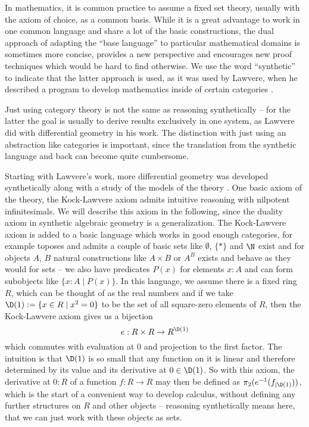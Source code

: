 
In mathematics, it is common practice to assume a fixed set theory, usually with the axiom of choice, as a common basis. While it is a great advantage to work in one common language and share a lot of the basic constructions, the dual approach of adapting the  ``base language'' to particular mathematical domains is sometimes more concise, provides a new perspective and encourages new proof techniques which would be hard to find otherwise.
We use the word ``synthetic'' to indicate that the latter approach is used,
as it was used by Lawvere, when he described a program to develop mathematics inside of certain categories \cite{lawvere-categorical-dynamics}.

Just using category theory is not the same as reasoning synthetically -- for the latter the goal is usually to derive results exclusively in one system,
as Lawvere did with differential geometry in his work.
The distinction with just using an abstraction like categories is important, since the translation from the synthetic language and back can become quite cumbersome.

Starting with Lawvere's work, more differential geometry was developed synthetically \cite{kock-sdg} along with a study of the models of the theory \cite{moerdijk-reyes}.
One basic axiom of the theory, the Kock-Lawvere axiom admits intuitive reasoning with nilpotent infinitesimals.
We will describe this axiom in the following, since the duality axiom in synthetic algebraic geometry is a generalization.
The Kock-Lawvere axiom is added to a basic language which works in good enough categories, for example toposes and admits a couple of basic sets like $\emptyset$, $\{\ast\}$ and $\N$ exist and for objects $A$, $B$ natural constructions like $A\times B$ or $A^B$ exists and behave as they would for sets -- we also have predicates $P(x)$ for elements $x:A$ and can form subobjects like $\{x:A\mid P(x)\}$.
In this language, we assume there is a fixed ring $R$, which can be thought of as the real numbers and if we take $\D(1):=\{x\in R\mid x^2=0\}$ to be the set of all square-zero elements of $R$, then the Kock-Lawvere axiom gives us a bijection
\[ e : R \times R  \to R^{\D(1)} \]
which commutes with evaluation at 0 and projection to the first factor.
The intuition is that $\D(1)$ is so small that any function on it is linear and therefore determined by its value and its derivative at $0\in\D(1)$.
So with this axiom, the derivative at $0:R$ of a function $f : R \to R$ may then be defined as $\pi_2(e^{-1}(f_{\vert \D(1)}))$, which is the start of a convenient way to develop calculus, without defining any further structures on $R$ and other objects -- reasoning synthetically means here, that we can just work with these objects as sets.

